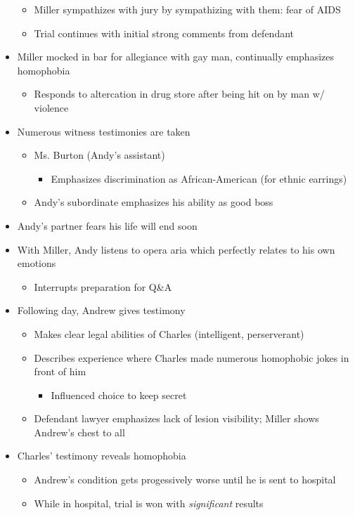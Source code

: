 \documentclass{article}
\begin{document}
\begin{itemize}
\begin{itemize}
            \item Miller sympathizes with jury by sympathizing with them: fear of AIDS 
            \item Trial continues with initial strong comments from defendant 
        \end{itemize}
        \item Miller mocked in bar for allegiance with gay man, continually emphasizes homophobia  
        \begin{itemize}
            \item Responds to altercation in drug store after being hit on by man w/ violence
        \end{itemize}
        \item Numerous witness testimonies are taken
        \begin{itemize}
            \item Ms. Burton (Andy's assistant)
            \begin{itemize}
                \item Emphasizes discrimination as African-American (for ethnic earrings)
            \end{itemize}
            \item Andy's subordinate emphasizes his ability as good boss
        \end{itemize}
        \item Andy's partner fears his life will end soon 
        \item With Miller, Andy listens to opera aria which perfectly relates to his own emotions
        \begin{itemize}
            \item Interrupts preparation for Q\&A
        \end{itemize}
        \item Following day, Andrew gives testimony 
        \begin{itemize}
            \item Makes clear legal abilities of Charles (intelligent, perserverant)
            \item Describes experience where Charles made numerous homophobic jokes in front of him 
            \begin{itemize}
                \item Influenced choice to keep secret 
            \end{itemize}
            \item Defendant lawyer emphasizes lack of lesion visibility; Miller shows Andrew's chest to all 
        \end{itemize}
        \item Charles' testimony reveals homophobia
        \begin{itemize}
            \item Andrew's condition gets progessively worse until he is sent to hospital 
            \item While in hospital, trial is won with \textit{significant} results
        \end{itemize}
    \end{itemize}
    
\end{document}
